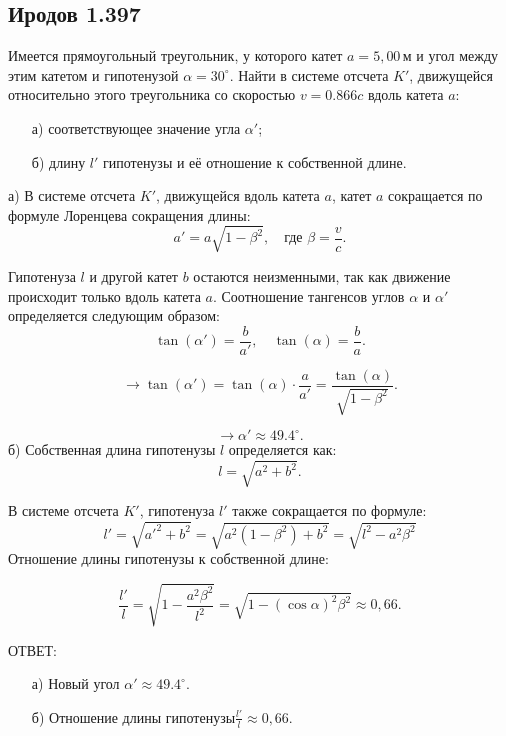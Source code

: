 \subsection*{Иродов 1.397}

\setcounter{equation}{0}

Имеется прямоугольный треугольник, у которого катет \( a = 5,00 \, \text{м} \) и угол между этим катетом и гипотенузой \( \alpha = 30^\circ \). Найти в системе отсчета \( K' \), движущейся относительно этого треугольника со скоростью \( v = 0.866c \) вдоль катета \( a \):
\begin{itemize}
    \item[а)] соответствующее значение угла \( \alpha' \);
    \item[б)] длину \( l' \) гипотенузы и её отношение к собственной длине.
\end{itemize}

\noindent\hrulefill

а) 
В системе отсчета \( K' \), движущейся вдоль катета \( a \), катет \( a \) сокращается по формуле Лоренцева сокращения длины:
\[
a' = a \sqrt{1 - \beta^2}, \quad \text{где } \beta = \frac{v}{c}.
\]


Гипотенуза \( l \) и другой катет \( b \) остаются неизменными, так как движение происходит только вдоль катета \( a \).
Соотношение тангенсов углов \( \alpha \) и \( \alpha' \) определяется следующим образом:
\[
\tan(\alpha') = \frac{b}{a'}, \quad \tan(\alpha) = \frac{b}{a}.
\]

\[
\rightarrow \tan(\alpha') = \tan(\alpha) \cdot \frac{a}{a'} =   \frac{\tan(\alpha)}{\sqrt{1 - \beta^2}}.
\]

\[
\rightarrow  \alpha' \approx 49.4^\circ.
\]
б)
Собственная длина гипотенузы \( l \) определяется как:
\[
l = \sqrt{a^2 + b^2}.
\]

В системе отсчета \( K' \), гипотенуза \( l' \) также сокращается по формуле:
\[
l' = \sqrt{a'^2 + b^2} = \sqrt{a^2(1 - \beta^2) + b^2} = \sqrt{l^2 - a^2\beta^2}
\]
Отношение длины гипотенузы к собственной длине:

\[
\frac{l'}{l} = \sqrt{1 - \frac{a^2 \beta^2}{l^2}} = \sqrt{1 - (\cos \alpha)^2 \beta^2} \approx 0,66.
\]

ОТВЕТ: 
\begin{itemize}
    \item[а)] Новый угол \( \alpha' \approx 49.4^\circ \).
    \item[б)] Отношение длины гипотенузы\( \frac{l'}{l} \approx 0,66 \).
\end{itemize}

